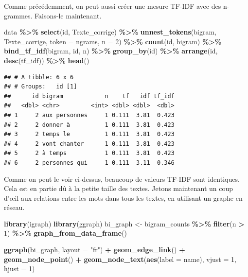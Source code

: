 \documentclass[
]{article}
\newenvironment{Shaded}{\begin{snugshade}}{\end{snugshade}}
\newcommand{\AttributeTok}[1]{\textcolor[rgb]{0.13,0.29,0.53}{#1}}
\newcommand{\DecValTok}[1]{\textcolor[rgb]{0.00,0.00,0.81}{#1}}
\newcommand{\FunctionTok}[1]{\textcolor[rgb]{0.13,0.29,0.53}{\textbf{#1}}}
\newcommand{\NormalTok}[1]{#1}
\newcommand{\OtherTok}[1]{\textcolor[rgb]{0.56,0.35,0.01}{#1}}
\newcommand{\SpecialCharTok}[1]{\textcolor[rgb]{0.81,0.36,0.00}{\textbf{#1}}}
\newcommand{\StringTok}[1]{\textcolor[rgb]{0.31,0.60,0.02}{#1}}
\begin{document}
Comme précédemment, on peut aussi créer une mesure TF-IDF avec des
n-grammes. Faisons-le maintenant.

\begin{Shaded}
\begin{Highlighting}[]
\NormalTok{data }\SpecialCharTok{\%\textgreater{}\%}
  \FunctionTok{select}\NormalTok{(id, Texte\_corrige) }\SpecialCharTok{\%\textgreater{}\%}
  \FunctionTok{unnest\_tokens}\NormalTok{(bigram, Texte\_corrige, }\AttributeTok{token =} \StringTok{\textquotesingle{}ngrams\textquotesingle{}}\NormalTok{, }\AttributeTok{n =} \DecValTok{2}\NormalTok{) }\SpecialCharTok{\%\textgreater{}\%}
  \FunctionTok{count}\NormalTok{(id, bigram) }\SpecialCharTok{\%\textgreater{}\%}
  \FunctionTok{bind\_tf\_idf}\NormalTok{(bigram, id, n) }\SpecialCharTok{\%\textgreater{}\%}
  \FunctionTok{group\_by}\NormalTok{(id) }\SpecialCharTok{\%\textgreater{}\%}
  \FunctionTok{arrange}\NormalTok{(id, }\FunctionTok{desc}\NormalTok{(tf\_idf)) }\SpecialCharTok{\%\textgreater{}\%}
  \FunctionTok{head}\NormalTok{()}
\end{Highlighting}
\end{Shaded}

\begin{verbatim}
## # A tibble: 6 x 6
## # Groups:   id [1]
##      id bigram            n    tf   idf tf_idf
##   <dbl> <chr>         <int> <dbl> <dbl>  <dbl>
## 1     2 aux personnes     1 0.111  3.81  0.423
## 2     2 donner à          1 0.111  3.81  0.423
## 3     2 temps le          1 0.111  3.81  0.423
## 4     2 vont chanter      1 0.111  3.81  0.423
## 5     2 à temps           1 0.111  3.81  0.423
## 6     2 personnes qui     1 0.111  3.11  0.346
\end{verbatim}

Comme on peut le voir ci-dessus, beaucoup de valeurs TF-IDF sont
identiques. Cela est en partie dû à la petite taille des textes. Jetons
maintenant un coup d'œil aux relations entre les mots dans tous les
textes, en utilisant un graphe en réseau.

\begin{Shaded}
\begin{Highlighting}[]
\FunctionTok{library}\NormalTok{(}\StringTok{\textquotesingle{}igraph\textquotesingle{}}\NormalTok{)}
\FunctionTok{library}\NormalTok{(}\StringTok{\textquotesingle{}ggraph\textquotesingle{}}\NormalTok{)}
\NormalTok{bi\_graph }\OtherTok{\textless{}{-}}\NormalTok{ bigram\_counts }\SpecialCharTok{\%\textgreater{}\%}
  \FunctionTok{filter}\NormalTok{(n }\SpecialCharTok{\textgreater{}} \DecValTok{1}\NormalTok{) }\SpecialCharTok{\%\textgreater{}\%} 
  \FunctionTok{graph\_from\_data\_frame}\NormalTok{()}

\FunctionTok{ggraph}\NormalTok{(bi\_graph, }\AttributeTok{layout =} \StringTok{"fr"}\NormalTok{) }\SpecialCharTok{+}
  \FunctionTok{geom\_edge\_link}\NormalTok{() }\SpecialCharTok{+}
  \FunctionTok{geom\_node\_point}\NormalTok{() }\SpecialCharTok{+}
  \FunctionTok{geom\_node\_text}\NormalTok{(}\FunctionTok{aes}\NormalTok{(}\AttributeTok{label =}\NormalTok{ name), }\AttributeTok{vjust =} \DecValTok{1}\NormalTok{, }\AttributeTok{hjust =} \DecValTok{1}\NormalTok{)}
\end{Highlighting}
\end{Shaded}
\end{document}
